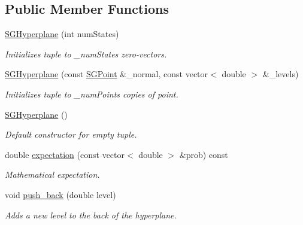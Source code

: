 \subsection*{Public Member Functions}
\begin{DoxyCompactItemize}
\item 
\mbox{\label{classSGHyperplane_a4fd24c9b78e60211ffe894949ae8b5d0}} 
\hyperlink{classSGHyperplane_a4fd24c9b78e60211ffe894949ae8b5d0}{S\+G\+Hyperplane} (int num\+States)
\begin{DoxyCompactList}\small\item\em Initializes tuple to \+\_\+num\+States zero-\/vectors. \end{DoxyCompactList}\item 
\mbox{\label{classSGHyperplane_a002bf1b44c69989e472582d669cf4342}} 
\hyperlink{classSGHyperplane_a002bf1b44c69989e472582d669cf4342}{S\+G\+Hyperplane} (const \hyperlink{classSGPoint}{S\+G\+Point} \&\+\_\+normal, const vector$<$ double $>$ \&\+\_\+levels)
\begin{DoxyCompactList}\small\item\em Initializes tuple to \+\_\+num\+Points copies of point. \end{DoxyCompactList}\item 
\mbox{\label{classSGHyperplane_a2154f1656b3b98398be07aae43294c5d}} 
\hyperlink{classSGHyperplane_a2154f1656b3b98398be07aae43294c5d}{S\+G\+Hyperplane} ()
\begin{DoxyCompactList}\small\item\em Default constructor for empty tuple. \end{DoxyCompactList}\item 
double \hyperlink{classSGHyperplane_a54ab1a4f18536c7eef048fb6579e797a}{expectation} (const vector$<$ double $>$ \&prob) const
\begin{DoxyCompactList}\small\item\em Mathematical expectation. \end{DoxyCompactList}\item 
\mbox{\label{classSGHyperplane_a62b2eccbe7ef8c8623416e3d992e1f91}} 
void \hyperlink{classSGHyperplane_a62b2eccbe7ef8c8623416e3d992e1f91}{push\+\_\+back} (double level)
\begin{DoxyCompactList}\small\item\em Adds a new level to the back of the hyperplane. \end{DoxyCompactList}\item 

\end{DoxyCompactItemize}
